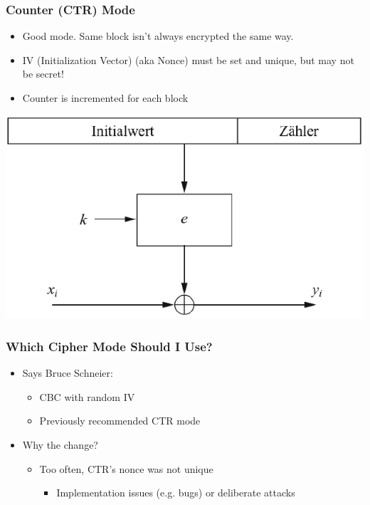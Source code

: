 \subsubsection{Counter (CTR) Mode}
\begin{minipage}{0.5\linewidth}
  \begin{itemize}
    \item Good mode. Same block isn't always encrypted the same way.
    \item IV (Initialization Vector) (aka Nonce) must be set and unique, but may not be secret!
    \item Counter is incremented for each block
  \end{itemize}
\end{minipage}
\begin{minipage}{0.5\linewidth}
  \includegraphics[width=\linewidth]{images/EmbeddedSecurity/ctrBlock}
\end{minipage}

\subsubsection{Which Cipher Mode Should I Use?}
\begin{itemize}
  \item Says Bruce Schneier:
        \begin{itemize}
          \item CBC with random IV
          \item Previously recommended CTR mode
        \end{itemize}
  \item Why the change?
        \begin{itemize}
          \item Too often, CTR's nonce was not unique
                \begin{itemize}
                  \item Implementation issues (e.g. bugs) or deliberate attacks
                \end{itemize}
        \end{itemize}
\end{itemize}

